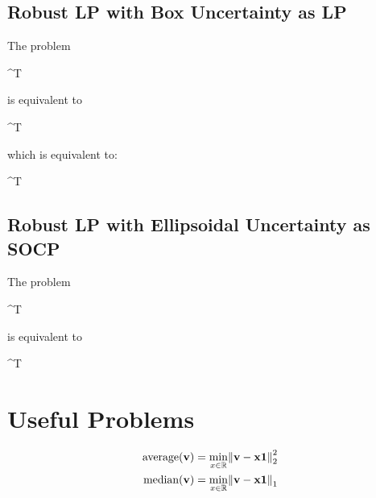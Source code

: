 \subsection{Robust LP with Box Uncertainty as LP}

The problem
\begin{mini!}{\vx}{\vc^T \vx}{}{}
\end{mini!}
is equivalent to
\begin{mini!}{\vx}{\vc^T \vx}{}{}
\end{mini!}
which is equivalent to:
\begin{mini!}{\vx}{\vc^T \vx}{}{}
\end{mini!}

\subsection{Robust LP with Ellipsoidal Uncertainty as SOCP}

The problem
\begin{mini!}{\vx}{\vc^T \vx}{}{}
\end{mini!}
is equivalent to
\begin{mini!}{\vx}{\vc^T \vx}{}{}
\end{mini!}

\section{Useful Problems}

\begin{align}
\textrm{average}(\mathbf{v}) &= \min_{x\in\mathbb{R}} \norm{\mathbf{v}-\mathbf{x}\mathbf{1}}_2^2 \\
\textrm{median}(\mathbf{v}) &= \min_{x\in\mathbb{R}} \norm{\mathbf{v}-\mathbf{x}\mathbf{1}}_1
\end{align}